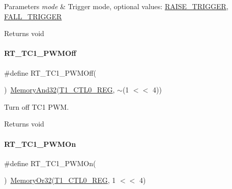 \begin{DoxyParams}{Parameters}
{\em mode} & Trigger mode, optional values\+: \mbox{\hyperlink{a00020_abda90eda34a640b130f48a6ade23fe22}{R\+A\+I\+S\+E\+\_\+\+T\+R\+I\+G\+G\+ER}}, \mbox{\hyperlink{a00020_a9bbaf5b9e2125c7597249c7113b20e6c}{F\+A\+L\+L\+\_\+\+T\+R\+I\+G\+G\+ER}} \\
\hline
\end{DoxyParams}
\begin{DoxyReturn}{Returns}
void 
\end{DoxyReturn}
\mbox{\label{a00044_afbffb90a80851e9a1e6e3dc03938c547}} 
\paragraph{\texorpdfstring{R\+T\+\_\+\+T\+C1\+\_\+\+P\+W\+M\+Off}{RT\_TC1\_PWMOff}}
{\footnotesize\ttfamily \#define R\+T\+\_\+\+T\+C1\+\_\+\+P\+W\+M\+Off(\begin{DoxyParamCaption}{ }\end{DoxyParamCaption})~\mbox{\hyperlink{a00020_ad87cedffcaadc51db22594fce55173d4}{Memory\+And32}}(\mbox{\hyperlink{a00020_adadaa0ab1ebbd7ba9b70dfd24c3ed44da38632250c2e72df96fcaa3f8bd8ecc5e}{T1\+\_\+\+C\+T\+L0\+\_\+\+R\+EG}}, $\sim$(1 $<$$<$ 4))}



Turn off T\+C1 P\+WM. 

\begin{DoxyReturn}{Returns}
void 
\end{DoxyReturn}
\mbox{\label{a00044_a66b006ccc7fcf8165e1bed013985b92e}} 
\paragraph{\texorpdfstring{R\+T\+\_\+\+T\+C1\+\_\+\+P\+W\+M\+On}{RT\_TC1\_PWMOn}}
{\footnotesize\ttfamily \#define R\+T\+\_\+\+T\+C1\+\_\+\+P\+W\+M\+On(\begin{DoxyParamCaption}{ }\end{DoxyParamCaption})~\mbox{\hyperlink{a00020_a27874a97deab7cecdde5ddecf466e31e}{Memory\+Or32}}(\mbox{\hyperlink{a00020_adadaa0ab1ebbd7ba9b70dfd24c3ed44da38632250c2e72df96fcaa3f8bd8ecc5e}{T1\+\_\+\+C\+T\+L0\+\_\+\+R\+EG}}, 1 $<$$<$ 4)}



